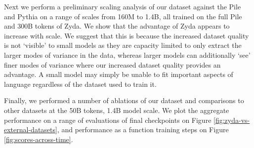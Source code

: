 \documentclass{article}
\begin{document}
Next we perform a preliminary scaling analysis of our dataset against the Pile and Pythia on a range of scales from 160M to 1.4B, all trained on the full Pile and 300B tokens of Zyda. We show that the advantage of Zyda appears to increase with scale. We suggest that this is because the increased dataset quality is not `visible' to small models as they are capacity limited to only extract the larger modes of variance in the data, whereas larger models can additionally `see' finer modes of variance where our increased dataset quality provides an advantage. A small model may simply be unable to fit important aspects of language regardless of the dataset used to train it.

Finally, we performed a number of ablations of our dataset and comparisons to other datasets at the 50B tokens, 1.4B model scale. We plot the aggregate performance on a range of evaluations of final checkpoints on Figure \ref{fig:zyda-vs-external-datasets}, and performance as a function training steps on Figure \ref{fig:scores-across-time}.
\end{document}
